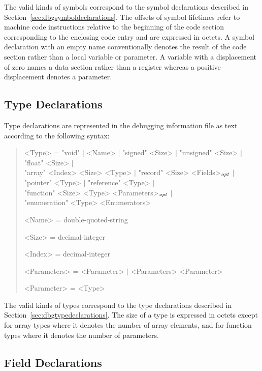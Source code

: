 The valid kinds of symbols correspond to the symbol declarations described in Section~\ref{sec:dbgsymboldeclarations}.
The offsets of symbol lifetimes refer to machine code instructions relative to the beginning of the code section corresponding to the enclosing code entry and are expressed in octets.
A symbol declaration with an empty name conventionally denotes the result of the code section rather than a local variable or parameter.
A variable with a displacement of zero names a data section rather than a register whereas a positive displacement denotes a parameter.

\subsection{Type Declarations}

Type declarations are represented in the debugging information file as text according to the following syntax:

\begin{quote}\begin{grammar}
<Type> = "void" $\mid$ <Name> $\mid$ "signed" <Size> $\mid$ "unsigned" <Size> $\mid$ "float" <Size> $\mid$ \\ "array" <Index> <Size> <Type> $\mid$ "record" <Size> <Fields>$_\mathit{opt}$ $\mid$ \\ "pointer" <Type> $\mid$ "reference" <Type> $\mid$ \\ "function" <Size> <Type> <Parameters>$_\mathit{opt}$ $\mid$ \\ "enumeration" <Type> <Enumerators> \par
<Name> = double-quoted-string \par
<Size> = decimal-integer \par
<Index> = decimal-integer \par
<Parameters> = <Parameter> $\mid$ <Parameters> <Parameter> \par
<Parameter> = <Type> \par
\end{grammar}\end{quote}

The valid kinds of types correspond to the type declarations described in Section~\ref{sec:dbgtypedeclarations}.
The size of a type is expressed in octets except for array types where it denotes the number of array elements, and for function types where it denotes the number of parameters.

\subsection{Field Declarations}

